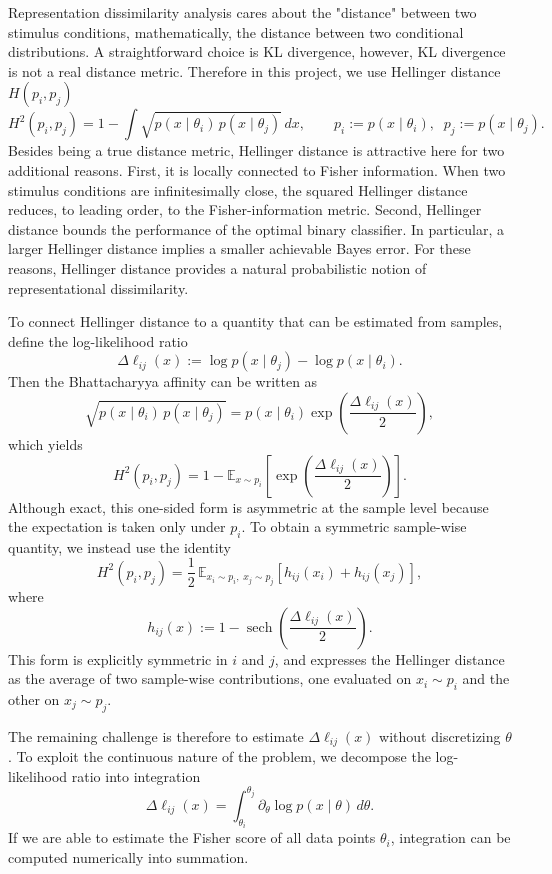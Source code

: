 Representation dissimilarity analysis cares about the "distance" between two stimulus conditions, mathematically, the distance between two conditional distributions. A straightforward choice is KL divergence, however, KL divergence is not a real distance metric. Therefore in this project, we use Hellinger distance $H(p_i,p_j)$
\[
H^2(p_i,p_j)
=
1-\int \sqrt{p(x\mid \theta_i)\,p(x\mid \theta_j)}\,dx,
\qquad
p_i:=p(x\mid \theta_i),\;\; p_j:=p(x\mid \theta_j).
\]
Besides being a true distance metric, Hellinger distance is attractive here for two additional reasons. First, it is locally connected to Fisher information. When two stimulus conditions are infinitesimally close, the squared Hellinger distance reduces, to leading order, to the Fisher-information metric. Second, Hellinger distance bounds the performance of the optimal binary classifier. In particular, a larger Hellinger distance implies a smaller achievable Bayes error. For these reasons, Hellinger distance provides a natural probabilistic notion of representational dissimilarity.

To connect Hellinger distance to a quantity that can be estimated from samples, define the log-likelihood ratio
\[
\Delta \ell_{ij}(x)
:=
\log p(x\mid \theta_j)-\log p(x\mid \theta_i).
\]
Then the Bhattacharyya affinity can be written as
\[
\sqrt{p(x\mid \theta_i)\,p(x\mid \theta_j)}
=
p(x\mid \theta_i)\exp\!\left(\frac{\Delta \ell_{ij}(x)}{2}\right),
\]
which yields
\[
H^2(p_i,p_j)
=
1-
\mathbb E_{x\sim p_i}
\left[
\exp\!\left(\frac{\Delta \ell_{ij}(x)}{2}\right)
\right].
\]
Although exact, this one-sided form is asymmetric at the sample level because the expectation is taken only under \(p_i\). To obtain a symmetric sample-wise quantity, we instead use the identity
\[
H^2(p_i,p_j)
=
\frac12\,
\mathbb E_{x_i\sim p_i,\;x_j\sim p_j}
\left[
h_{ij}(x_i)+h_{ij}(x_j)
\right],
\]
where
\[
h_{ij}(x)
:=
1-\operatorname{sech}\!\left(\frac{\Delta \ell_{ij}(x)}{2}\right).
\]
This form is explicitly symmetric in \(i\) and \(j\), and expresses the Hellinger distance as the average of two sample-wise contributions, one evaluated on \(x_i\sim p_i\) and the other on \(x_j\sim p_j\).

The remaining challenge is therefore to estimate \(\Delta \ell_{ij}(x)\) without discretizing \(\theta\). To exploit the continuous nature of the problem, we decompose the log-likelihood ratio into integration
\[
\Delta \ell_{ij}(x)
=
\int_{\theta_i}^{\theta_j}
\partial_\theta \log p(x\mid \theta)\,d\theta.
\]
If we are able to estimate the Fisher score of all data points $\theta_i$, integration can be computed numerically into summation.


